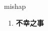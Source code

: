 
\begin{frame}
{\huge mishap}
\begin{center}
\begin{enumerate}\Large
  \item \textbf{不幸之事}
\end{enumerate}
\end{center}
\end{frame}
